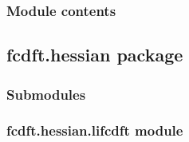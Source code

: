\documentclass[letterpaper,10pt,english]{sphinxmanual}
\begin{document}
\subsubsection{Module contents}
\label{\detokenize{fcdft.grad:module-fcdft.grad}}\label{\detokenize{fcdft.grad:module-contents}}
\sphinxstepscope


\subsection{fcdft.hessian package}
\label{\detokenize{fcdft.hessian:fcdft-hessian-package}}\label{\detokenize{fcdft.hessian::doc}}

\subsubsection{Submodules}
\label{\detokenize{fcdft.hessian:submodules}}

\subsubsection{fcdft.hessian.lifcdft module}
\label{\detokenize{fcdft.hessian:module-fcdft.hessian.lifcdft}}\label{\detokenize{fcdft.hessian:fcdft-hessian-lifcdft-module}}
\end{document}
